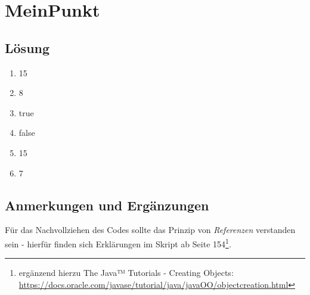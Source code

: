 \chapter{MeinPunkt}

\section*{Lösung}

\begin{enumerate}
    \item 15
    \item 8
    \item true
    \item false
    \item 15
    \item 7
\end{enumerate}


\section*{Anmerkungen und Ergänzungen}

Für das Nachvollziehen des Codes sollte das Prinzip von \textit{Referenzen} verstanden sein - hierfür finden sich
Erklärungen im Skript ab Seite 154\footnote{
    ergänzend hierzu The Java™ Tutorials - Creating Objects: \url{https://docs.oracle.com/javase/tutorial/java/javaOO/objectcreation.html}
}.
